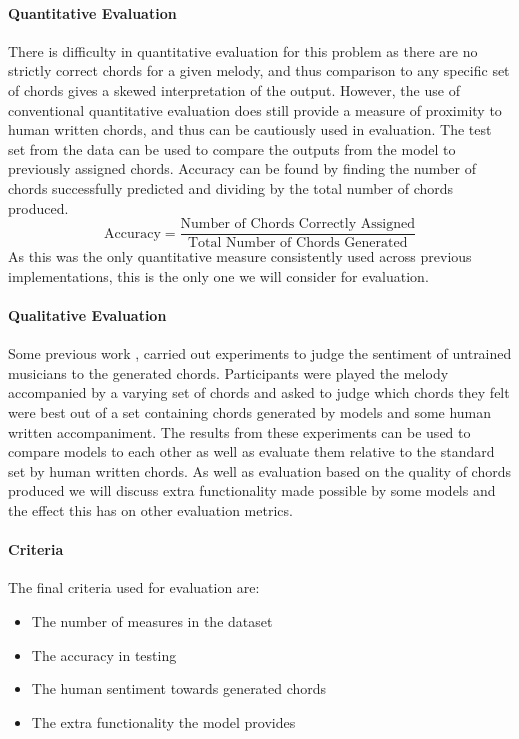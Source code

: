 \paragraph{Quantitative Evaluation}
There is difficulty in quantitative evaluation for this problem as there are no strictly correct chords for a given melody, and thus comparison to any specific set of chords gives a skewed interpretation of the output.
However, the use of conventional quantitative evaluation does still provide a measure of proximity to human written chords, and thus can be cautiously used in evaluation.
The test set from the data can be used to compare the outputs from the model to previously assigned chords. Accuracy can be found by finding the number of chords successfully predicted and dividing by the total number of chords produced.
\begin{equation}
    \text{Accuracy} = \frac{\text{Number of Chords Correctly Assigned}}{\text{Total Number of Chords Generated}}
\end{equation}
As this was the only quantitative measure consistently used across previous implementations, this is the only one we will consider for evaluation.

\paragraph{Qualitative Evaluation}
Some previous work ,  carried out experiments to judge the sentiment of untrained musicians to the generated chords.
Participants were played the melody accompanied by a varying set of chords and asked to judge which chords they felt were best out of a set containing chords generated by models and some human written accompaniment.
The results from these experiments can be used to compare models to each other as well as evaluate them relative to the standard set by human written chords.
As well as evaluation based on the quality of chords produced we will discuss extra functionality made possible by some models and the effect this has on other evaluation metrics.

\paragraph{Criteria}
The final criteria used for evaluation are:
\begin{itemize}
    \item The number of measures in the dataset
    \item The accuracy in testing
    \item The human sentiment towards generated chords
    \item The extra functionality the model provides
\end{itemize}

